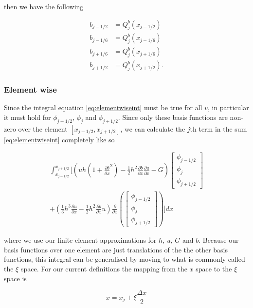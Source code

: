 then we have the following

\begin{align*}
b_{j-1/2} & = Q^b_j(x_{j-1/2}) \\
b_{j-1/6} & = Q^b_j(x_{j-1/6}) \\
b_{j+1/6} & = Q^b_j(x_{j+1/6}) \\
b_{j+1/2} & = Q^b_j(x_{j+1/2}). 
\end{align*}

\subsubsection{Element wise}
Since the integral equation \eqref{eq:elementwiseint} must be true for all $v$, in particular it must hold for $\phi_{j-1/2}$, $\phi_{j}$ and $\phi_{j+1/2}$. Since only these basis functions are non-zero over the element $\left[x_{j-1/2}, x_{j+1/2}\right]$, we can calculate the $j$th term in the sum \eqref{eq:elementwiseint} completely like so

\begin{multline}
\int_{x_{j-1/2} }^{{x_{j+1/2}}} \Bigg[  \left( uh \left(1 + \frac{\partial b}{\partial x}^2 \right)  - \frac{1}{2}h^2\frac{\partial b}{\partial x}  \frac{\partial u }{\partial x}  -  G \right) \begin{bmatrix}
\phi_{j-1/2}\\\phi_j \\\phi_{j+1/2}
\end{bmatrix}   \\ +  \left( \frac{1}{3}h^3  \frac{\partial {u}}{\partial x}    -     \frac{1}{2}h^2\frac{\partial b}{\partial x} u    \right) \frac{\partial}{\partial x}\left(\begin{bmatrix}
\phi_{j-1/2}\\\phi_j \\\phi_{j+1/2}
\end{bmatrix} \right) \Bigg]dx
\end{multline}

where we use our finite element approximations for $h$, $u$, $G$ and $b$. Because our basis functions over one element are just translations of the the other basis functions, this integral can be generalised by moving to what is commonly called the $\xi$ space. For our current definitions the mapping from the $x$ space to the $\xi$ space is

\begin{equation*}
x = x_j + \xi \frac{\Delta x}{2}
\end{equation*}

